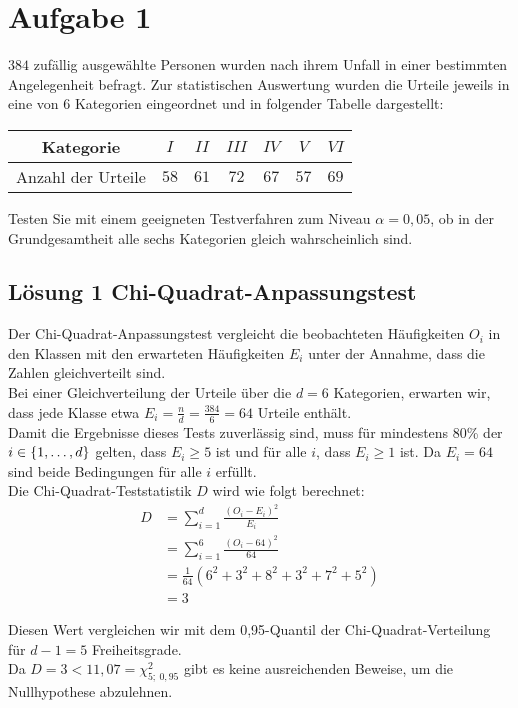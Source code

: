 \documentclass[main.tex]{subfiles}
\begin{document}
\section{Aufgabe 1}
$384$ zufällig ausgewählte Personen wurden nach ihrem Unfall in einer bestimmten Angelegenheit befragt. Zur statistischen Auswertung wurden die Urteile jeweils in eine von $6$ Kategorien eingeordnet und in folgender Tabelle dargestellt:
\begin{center}
\begin{tabular}{c|c|c|c|c|c|c}
	Kategorie & $I$ & $II$ & $III$ & $IV$ & $V$ & $VI$ \\ \hline
	Anzahl der Urteile & $58$ & $61$ & $72$ & $67$ & $57$ & $69$
\end{tabular}
\end{center}
Testen Sie mit einem geeigneten Testverfahren zum Niveau $\alpha = 0,05$, ob in der Grundgesamtheit alle sechs Kategorien gleich wahrscheinlich sind.

\subsection{Lösung 1 Chi-Quadrat-Anpassungstest}
Der Chi-Quadrat-Anpassungstest vergleicht die beobachteten Häufigkeiten $O_i$ in den Klassen mit den erwarteten Häufigkeiten $E_i$ unter der Annahme, dass die Zahlen gleichverteilt sind.\\

Bei einer Gleichverteilung der Urteile über die $d=6$ Kategorien, erwarten wir, dass jede Klasse etwa $E_i = \frac{n}{d} = \frac{384}{6} = 64$ Urteile enthält.\\

Damit die Ergebnisse dieses Tests zuverlässig sind, muss für mindestens 80\% der $i \in \{1, \dots, d\}$ gelten, dass $E_i \geq 5$ ist und für alle $i$, dass $E_i \geq 1$ ist. Da $E_i = 64$ sind beide Bedingungen für alle $i$ erfüllt.\\

Die Chi-Quadrat-Teststatistik $D$ wird wie folgt berechnet:
$$\begin{aligned}
	D &= \sum_{i=1}^{d} \frac{(O_i - E_i)^2}{E_i} \\
	&= \sum_{i=1}^6 \frac{(O_i - 64)^2}{64} \\
	&= \frac{1}{64} \left( 6^2 +3^2 + 8^2 + 3^2 + 7^2 + 5^2 \right)\\
	&= 3
\end{aligned}$$

Diesen Wert vergleichen wir mit dem 0,95-Quantil der Chi-Quadrat-Verteilung für $d-1=5$ Freiheitsgrade.\\

Da $D = 3 < 11,07 = \chi^2_{5;\ 0,95}$ gibt es keine ausreichenden Beweise, um die Nullhypothese abzulehnen.
\end{document}
